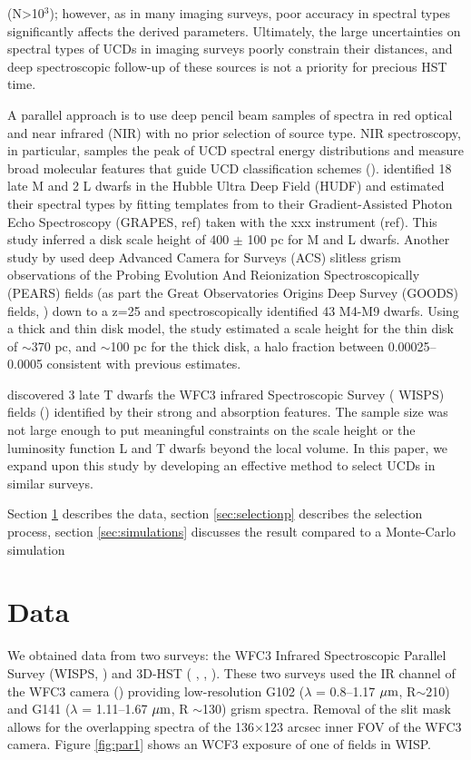 \documentclass[manuscript]{aastex63}
\begin{document}
(N\textgreater 10$^3$); however, as in many imaging surveys, poor accuracy in spectral types significantly affects the derived parameters. Ultimately, the large uncertainties on spectral types  of UCDs in imaging surveys poorly constrain their distances, and deep spectroscopic follow-up of these sources is not a priority for precious HST time. 

A parallel approach is to use deep pencil beam samples of spectra in red optical and near infrared (NIR) with no prior selection of source type. NIR spectroscopy, in particular, samples the peak of UCD spectral energy distributions and measure broad molecular features that guide UCD classification schemes (\citealt{2005ARA&A..43..195K}). \citet{2005ApJ...622..319P} identified 18 late M and 2 L dwarfs in the Hubble Ultra Deep Field (HUDF) and estimated their spectral types by fitting templates from \citet{Kirkpatrick2000} to their Gradient-Assisted Photon Echo Spectroscopy (GRAPES, ref) taken with the xxx instrument (ref). This study inferred a disk scale height of 400 $\pm$ 100 pc for M and L dwarfs. Another study by \citet{2009ApJ...695.1591P} used deep Advanced Camera for Surveys (ACS) slitless grism observations of the Probing Evolution And Reionization Spectroscopically (PEARS) fields (as part the Great Observatories Origins Deep Survey (GOODS) fields, \citealt{Giavalisco2004}) down to a z=25 and spectroscopically identified 43 M4-M9 dwarfs. Using a thick and thin disk model, the study estimated a scale height for the thin disk of $\sim$370 pc, and $\sim$100 pc for the thick disk, a halo fraction between 0.00025--0.0005 consistent with previous estimates. 

\citealt{2012ApJ...752L..14M} discovered 3 late T dwarfs the WFC3 infrared Spectroscopic Survey ( WISPS) fields (\citealt{2010ApJ...723..104A}) identified by their strong \meth and \wat absorption features. The sample size was not large enough to put meaningful constraints on the scale height or the luminosity function L and T dwarfs beyond the local volume. In this paper, we expand upon this study by developing an effective method to select UCDs in similar surveys.

Section \ref{sec:data} describes the data, section \ref{sec:selectionp} describes the selection process, section \ref{sec:simulations} discusses the result compared to a Monte-Carlo simulation

\section{Data}\label{sec:data}
We obtained data from two surveys: the WFC3 Infrared Spectroscopic Parallel Survey (WISPS, \citealt{2010ApJ...723..104A}) and 3D-HST ( \citealt{Momcheva2016}, \citealt{2012ApJS..200...13B}, \citealt{Skelton2014}). These two surveys used the IR channel of the WFC3 camera (\citealt{doi:10.1117/12.789581}) providing low-resolution G102 ($\lambda$ = 0.8--1.17 $\mbox{$\mu$m}$, R$\sim$210) and G141 ($\lambda$ = 1.11--1.67 $\mbox{$\mu$m}$, R $\sim$130) grism spectra. Removal of the slit mask allows for the overlapping spectra of the 136$\times$123 arcsec inner FOV of the WFC3 camera. Figure \ref{fig:par1} shows an WCF3 exposure of one of fields in WISP.
\end{document}
